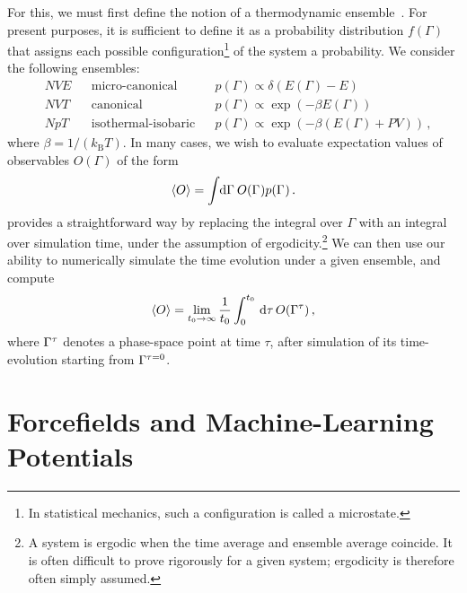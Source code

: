 For this, we must first define the notion of a thermodynamic ensemble~\cite[ch.~2]{tuckerman2010}. For present purposes, it is sufficient to define it as a probability distribution $f(\Gamma)$ that assigns each possible configuration\footnote{In statistical mechanics, such a configuration is called a microstate.} of the system a probability. We consider the following ensembles:
\begin{align}
	&NVE&& \text{micro-canonical} && p(\Gamma) \propto \delta(E(\Gamma) - E) \nonumber\\
	&NVT&& \text{canonical}       &&  p(\Gamma) \propto \exp{(-\beta E(\Gamma))} \nonumber\\
	&NpT&& \text{isothermal-isobaric}       &&  p(\Gamma) \propto \exp{(-\beta (E(\Gamma) + P V))} \,,\nonumber
\end{align}
where $\beta = 1/(k_{\text{B}} T)$.
In many cases, we wish to evaluate expectation values of observables $O(\Gamma)$ of the form
\begin{equation}
	\braket{O} = \int_{} \, \text{d}\Gamma_{}^{}\, O(\Gamma_{}^{}) p(\Gamma_{}^{}) \, .
\end{equation}
\md provides a straightforward way by replacing the integral over $\Gamma$ with an integral over simulation time, under the assumption of ergodicity.\footnote{A system is ergodic when the time average and ensemble average coincide. It is often difficult to prove rigorously for a given system; ergodicity is therefore often simply assumed.} We can then use our ability to numerically simulate the time evolution under a given ensemble, and compute
\begin{equation}
	\braket{O} = \lim_{t_0 \rightarrow \infty} \frac{1}{t_0} \int_{0}^{t_0} \, \text{d} \tau\,  O(\Gamma_{}^{\tau}) \, ,
\end{equation}
where $\Gamma_{}^{\tau}$ denotes a phase-space point at time $\tau$, after simulation of its time-evolution starting from $\Gamma_{}^{\tau=0}$.

\section{Forcefields and Machine-Learning Potentials}
\label{sec:ffs}

